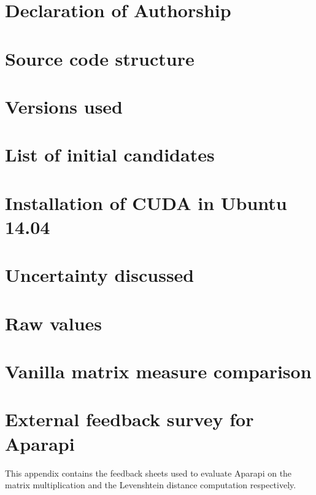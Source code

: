 \printbibliography

\chapter*{Declaration of Authorship}


\appendix
\chapter{Source code structure}


\chapter{Versions used}


\chapter{List of initial candidates} \label{candidates}


\chapter{Installation of CUDA in Ubuntu 14.04}


\chapter{Uncertainty discussed} \label{uncertain}


\chapter{Raw values}


\chapter{Vanilla matrix measure comparison} \label{vanilla matrix both}


\chapter{External feedback survey for Aparapi} \label{aparapi code}

This appendix contains the feedback sheets used to evaluate Aparapi on the matrix multiplication and the Levenshtein distance computation respectively.



